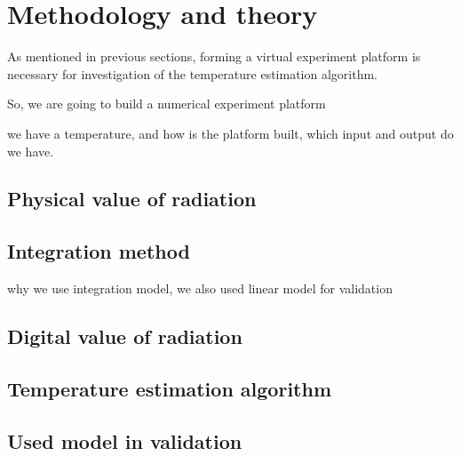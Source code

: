 \chapter{Methodology and theory}%
As mentioned in previous sections, forming a virtual experiment platform 
is necessary for investigation of the temperature estimation algorithm. 


So, we are going to build a numerical experiment platform

we have a temperature, and how is the platform built, which input and 
output do we have.
%
%

%
%
\section{Physical value of radiation}%

%
%
\section{Integration method}%
why we use integration model, we also used linear model for validation
%
%
\section{Digital value of radiation}%

%
%

\section{Temperature estimation algorithm}


\section{Used model in validation}%

%
%
